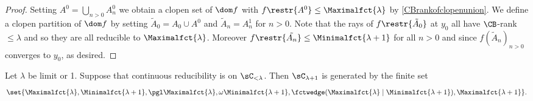 \begin{proof}
Setting $A^0=\bigcup_{n>0}A^0_n$ we obtain a clopen set of $\dom f$ with $f\restr{A^0}\leq\Maximalfct{\lambda}$ by \cref{CBrankofclopenunion}. We define a clopen partition of $\dom f$ by setting $\tilde{A}_0= A_0 \cup A^0$ and $\tilde{A}_n=A^1_n$ for $n>0$. Note that the rays of $f\restr{\tilde{A}_0}$ at $y_0$ all have $\CB$-rank $\leq \lambda$ and so they are all reducible to $\Maximalfct{\lambda}$. Moreover $f\restr{\tilde{A_n}}\leq \Minimalfct{\lambda+1}$ for all $n>0$ and since $f(\tilde{A}_n)_{n>0}$ converges to $y_0$, as desired.
\end{proof}

\begin{theorem}\label{FGatsuccessoroflimit}
Let $\lambda$ be limit or 1. Suppose that continuous reducibility is \bqo{} on $\sC_{<\lambda}$.
Then $\sC_{\lambda+1}$ is generated by the finite set 
\[\set{\Maximalfct{\lambda},\Minimalfct{\lambda+1},\pgl\Maximalfct{\lambda},\omega\Minimalfct{\lambda+1},
\fctwedge(\Maximalfct{\lambda}\mid\Minimalfct{\lambda+1}),\Maximalfct{\lambda+1}}.\]
\end{theorem}

